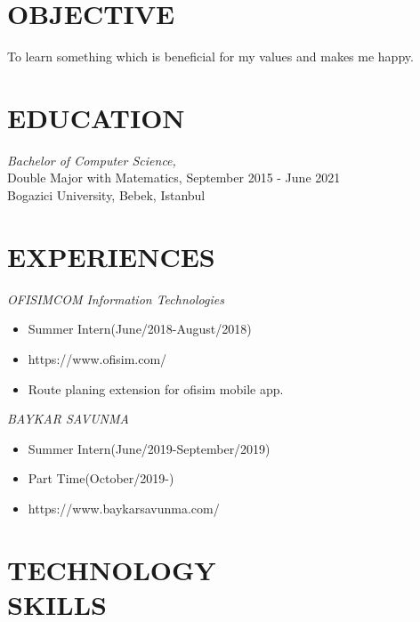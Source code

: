 \documentclass[margin, 10pt]{res} %
\begin{document}
\begin{resume}

 
\section{OBJECTIVE}  
To learn something which is beneficial for my values and makes me happy.


\section{EDUCATION}

{\sl Bachelor of Computer Science,} \\
{Double Major with Matematics,} \hfill September 2015 - June 2021 \\
Bogazici University, Bebek, Istanbul
 
\section{EXPERIENCES}
{\sl OFISIMCOM Information Technologies }
\begin{itemize}
    \item Summer Intern(June/2018-August/2018)
    \item https://www.ofisim.com/
    \item Route planing extension for ofisim mobile app.
\end{itemize}
{\sl BAYKAR SAVUNMA }
\begin{itemize}
    \item Summer Intern(June/2019-September/2019)
    \item Part Time(October/2019-)
    \item https://www.baykarsavunma.com/
\end{itemize}

\section{TECHNOLOGY \\ SKILLS} 


\end{resume}
\end{document}
